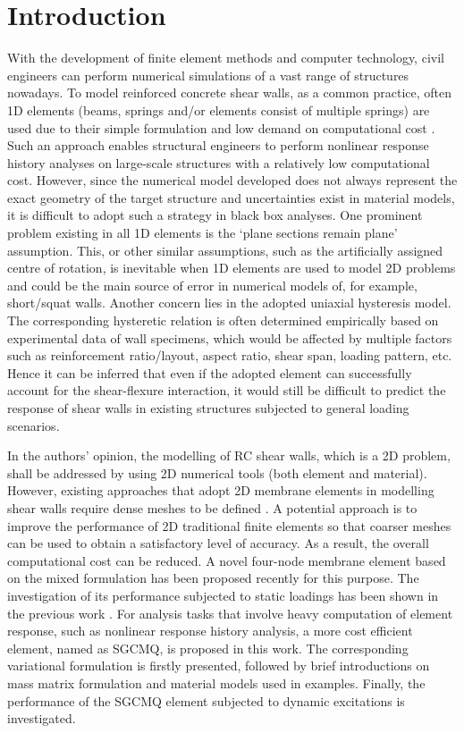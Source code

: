 \documentclass[3p,sort&compress,review,11pt,fleqn]{elsarticle}
\begin{document}
\section{Introduction}
With the development of finite element methods and computer technology, civil engineers can perform numerical simulations of a vast range of structures nowadays. To model reinforced concrete shear walls, as a common practice, often 1D elements (beams, springs and/or elements consist of multiple springs) are used due to their simple formulation and low demand on computational cost \citep[to name a few, see, e.g.,][]{Chaallal1996,Hidalgo2002,Orakcal2004,Lu2005,Belmouden2007,Martinelli2009,Tang2011,Pugh2015,Terzic2019,Bedeir2019}. Such an approach enables structural engineers to perform nonlinear response history analyses on large-scale structures with a relatively low computational cost. However, since the numerical model developed does not always represent the exact geometry of the target structure and uncertainties exist in material models, it is difficult to adopt such a strategy in black box analyses. One prominent problem existing in all 1D elements is the `plane sections remain plane' assumption. This, or other similar assumptions, such as the artificially assigned centre of rotation, is inevitable when 1D elements are used to model 2D problems and could be the main source of error in numerical models of, for example, short/squat walls. Another concern lies in the adopted uniaxial hysteresis model. The corresponding hysteretic relation is often determined empirically based on experimental data of wall specimens, which would be affected by multiple factors such as reinforcement ratio/layout, aspect ratio, shear span, loading pattern, etc. Hence it can be inferred that even if the adopted element can successfully account for the shear-flexure interaction, it would still be difficult to predict the response of shear walls in existing structures subjected to general loading scenarios.

In the authors' opinion, the modelling of RC shear walls, which is a 2D problem, shall be addressed by using 2D numerical tools (both element and material). However, existing approaches that adopt 2D membrane elements in modelling shear walls require dense meshes to be defined \citep[see, e.g.,][]{Dashti2017,Kolozvari2019}. A potential approach is to improve the performance of 2D traditional finite elements so that coarser meshes can be used to obtain a satisfactory level of accuracy. As a result, the overall computational cost can be reduced. A novel four-node membrane element based on the mixed formulation has been proposed recently \citep{Chang2019a} for this purpose. The investigation of its performance subjected to static loadings has been shown in the previous work \citep{Chang2019}. For analysis tasks that involve heavy computation of element response, such as nonlinear response history analysis, a more cost efficient element, named as SGCMQ, is proposed in this work. The corresponding variational formulation is firstly presented, followed by brief introductions on mass matrix formulation and material models used in examples. Finally, the performance of the SGCMQ element subjected to dynamic excitations is investigated.
\end{document}
